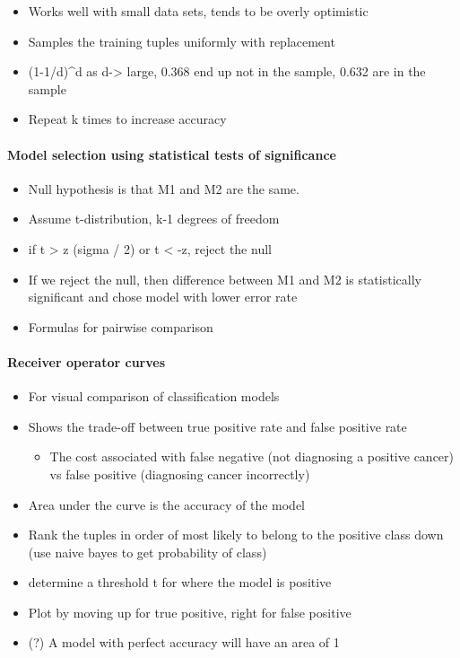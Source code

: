 \documentclass[11pt]{article}
\providecommand{\tightlist}{%
      \setlength{\itemsep}{0pt}\setlength{\parskip}{0pt}}
\begin{document}
    \begin{itemize}
\tightlist
\item
  Works well with small data sets, tends to be overly optimistic
\item
  Samples the training tuples uniformly with replacement
\item
  (1-1/d)\^{}d as d-\textgreater{} large, 0.368 end up not in the
  sample, 0.632 are in the sample
\item
  Repeat k times to increase accuracy
\end{itemize}

    \paragraph{Model selection using statistical tests of
significance}\label{model-selection-using-statistical-tests-of-significance}

    \begin{itemize}
\tightlist
\item
  Null hypothesis is that M1 and M2 are the same.
\item
  Assume t-distribution, k-1 degrees of freedom
\item
  if t \textgreater{} z (sigma / 2) or t \textless{} -z, reject the null
\item
  If we reject the null, then difference between M1 and M2 is
  statistically significant and chose model with lower error rate
\item
  Formulas for pairwise comparison
\end{itemize}

    \paragraph{Receiver operator curves}\label{receiver-operator-curves}

    \begin{itemize}
\tightlist
\item
  For visual comparison of classification models
\item
  Shows the trade-off between true positive rate and false positive rate

  \begin{itemize}
  \tightlist
  \item
    The cost associated with false negative (not diagnosing a positive
    cancer) vs false positive (diagnosing cancer incorrectly)
  \end{itemize}
\item
  Area under the curve is the accuracy of the model
\item
  Rank the tuples in order of most likely to belong to the positive
  class down (use naive bayes to get probability of class)
\item
  determine a threshold t for where the model is positive
\item
  Plot by moving up for true positive, right for false positive
\item
  (?) A model with perfect accuracy will have an area of 1
\end{itemize}
\end{document}
